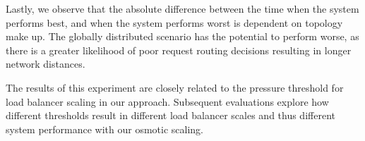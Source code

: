 Lastly, we observe that the absolute difference between the time when the system performs best, and when the system performs worst is dependent on topology make up.
The globally distributed scenario has the potential to perform worse, as there is a greater likelihood of poor request routing decisions resulting in longer network distances.

The results of this experiment are closely related to the pressure threshold for load balancer scaling in our approach.
Subsequent evaluations explore how different thresholds result in different load balancer scales and thus different system performance with our osmotic scaling.
